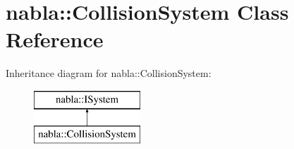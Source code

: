 \hypertarget{classnabla_1_1_collision_system}{}\section{nabla\+::Collision\+System Class Reference}
\label{classnabla_1_1_collision_system}
Inheritance diagram for nabla\+::Collision\+System\+:\begin{figure}[H]
\begin{center}
\leavevmode
\includegraphics[height=2.000000cm]{classnabla_1_1_collision_system}
\end{center}
\end{figure}
